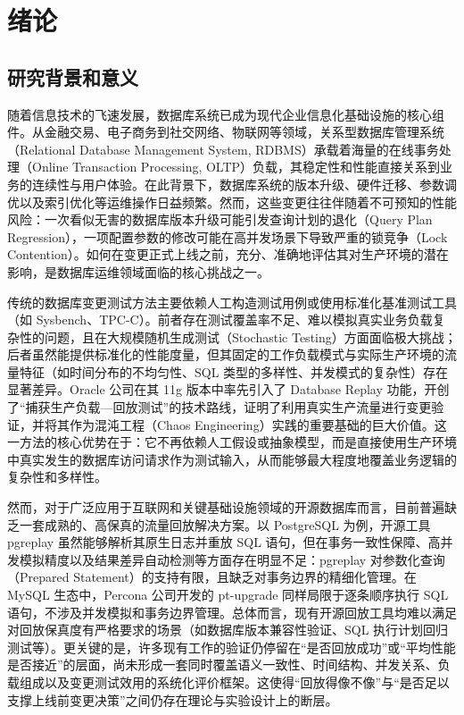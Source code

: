 
\newpage
\setcounter{table}{0}
\setcounter{figure}{0}
\section{绪论}
\subsection{研究背景和意义}

随着信息技术的飞速发展，数据库系统已成为现代企业信息化基础设施的核心组件。从金融交易、电子商务到社交网络、物联网等领域，关系型数据库管理系统（Relational Database Management System, RDBMS）\cite{DatabaseSystemConcepts}承载着海量的在线事务处理（Online Transaction Processing, OLTP）负载，其稳定性和性能直接关系到业务的连续性与用户体验\cite{TPC-C}。在此背景下，数据库系统的版本升级、硬件迁移、参数调优以及索引优化等运维操作日益频繁。然而，这些变更往往伴随着不可预知的性能风险：一次看似无害的数据库版本升级可能引发查询计划的退化（Query Plan Regression）\cite{QueryOptimization}，一项配置参数的修改可能在高并发场景下导致严重的锁竞争（Lock Contention）。如何在变更正式上线之前，充分、准确地评估其对生产环境的潜在影响，是数据库运维领域面临的核心挑战之一。

传统的数据库变更测试方法主要依赖人工构造测试用例或使用标准化基准测试工具（如 Sysbench\cite{sysbench}、TPC-C\cite{TPC-C}）。前者存在测试覆盖率不足、难以模拟真实业务负载复杂性的问题，且在大规模随机生成测试（Stochastic Testing）\cite{DBTest}方面面临极大挑战；后者虽然能提供标准化的性能度量，但其固定的工作负载模式与实际生产环境的流量特征（如时间分布的不均匀性、SQL 类型的多样性、并发模式的复杂性）存在显著差异\cite{ProductionWorkload}。Oracle 公司在其 11g 版本中率先引入了 Database Replay\cite{OracleDatabaseReplay} 功能，开创了“捕获生产负载—回放测试”的技术路线，证明了利用真实生产流量进行变更验证，并将其作为混沌工程（Chaos Engineering）\cite{ChaosEngineering}实践的重要基础的巨大价值。这一方法的核心优势在于：它不再依赖人工假设或抽象模型，而是直接使用生产环境中真实发生的数据库访问请求作为测试输入，从而能够最大程度地覆盖业务逻辑的复杂性和多样性。

然而，对于广泛应用于互联网和关键基础设施领域的开源数据库而言，目前普遍缺乏一套成熟的、高保真的流量回放解决方案。以 PostgreSQL 为例，开源工具 pgreplay\cite{pgreplay} 虽然能够解析其原生日志并重放 SQL 语句，但在事务一致性保障、高并发模拟精度以及结果差异自动检测等方面存在明显不足：pgreplay 对参数化查询（Prepared Statement）的支持有限，且缺乏对事务边界的精细化管理。在 MySQL 生态中，Percona 公司开发的 pt-upgrade\cite{ptupgrade} 同样局限于逐条顺序执行 SQL 语句，不涉及并发模拟和事务边界管理。总体而言，现有开源回放工具均难以满足对回放保真度有严格要求的场景（如数据库版本兼容性验证、SQL 执行计划回归测试等）。更关键的是，许多现有工作的验证仍停留在“是否回放成功”或“平均性能是否接近”的层面，尚未形成一套同时覆盖语义一致性、时间结构、并发关系、负载组成以及变更测试效用的系统化评价框架。这使得“回放得像不像”与“是否足以支撑上线前变更决策”之间仍存在理论与实验设计上的断层。

